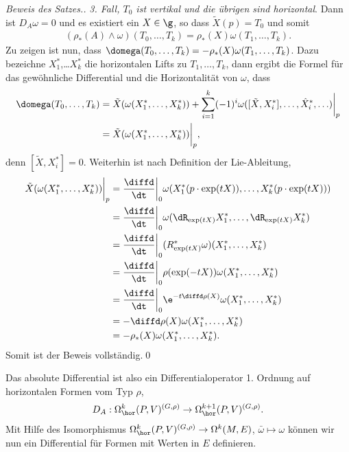 \documentclass[%
	paper=a5,%
	fleqn,%
	DIV=18,%
	BCOR=0mm,
	fontsize=11pt,
	titlepage=false,%
	bibliography=totoc,
	DIV=18,%
	twoside=true,
	pdftitle=Riemannsche Geometrie,
	pdfauthor=Uwe Semmelmann,
	numbers=noendperiod]%
	{scrbook}
\begin{document}
\begin{proof}[Beweis des Satzes.]
\textit{3. Fall, $T_0$ ist vertikal und die übrigen sind horizontal}. Dann ist
$D_A\omega = 0$ und es existiert ein $X\in \g$, so dass $\widetilde{X}(p) = T_0$
und somit
\begin{align*}
(\rho_*(A)\wedge\omega)(T_0,\ldots,T_k) = 
\rho_*(X)\omega(T_1,\ldots,T_k).
\end{align*}
Zu zeigen ist nun, dass $\domega(T_0,\ldots,T_k) =
-\rho_*(X)\omega(T_1,\ldots,T_k)$. Dazu bezeichne $X_1^*$,\ldots $X_k^*$ die
horizontalen Lifts zu $T_1,\ldots,T_k$, dann ergibt die Formel für das
gewöhnliche Differential und die Horizontalität von $\omega$, dass
\begin{align*}
\domega(T_0,\ldots,T_k) &= 
\tilde{X}(\omega(X_1^*,\ldots,X_k^*))
+ \sum_{i=1}^k
(-1)^{i} 
\omega([\tilde{X},X_i^*],\ldots,\hat{X}_i^*,\ldots)
\bigg|_{p}
\\
&= \tilde{X}(\omega(X_1^*,\ldots,X_k^*))\bigg|_{p},
\end{align*}
denn $[\tilde{X},X_i^*] = 0$. Weiterhin ist nach Definition der Lie-Ableitung,
\begin{align*}
\tilde{X}(\omega(X_1^*,\ldots,X_k^*))\bigg|_{p} &= 
\frac{\diffd}{\dt}\bigg|_0
\omega(X_1^*(p\cdot \exp(tX)),\ldots,X_k^*(p\cdot \exp(tX)))\\
&=
\frac{\diffd}{\dt}\bigg|_0
\omega(\dR_{\exp(tX)}X_1^*,\ldots,\dR_{\exp(tX)}X_k^*)\\
&= \frac{\diffd}{\dt}\bigg|_0
(R_{\exp(tX)}^*\omega)(X_1^*,\ldots,X_k^*)\\
&= \frac{\diffd}{\dt}\bigg|_0
\rho(\exp(-tX))\omega(X_1^*,\ldots,X_k^*)\\
&= \frac{\diffd}{\dt}\bigg|_0
\e^{-t\diffd\rho(X)}\omega(X_1^*,\ldots,X_k^*)\\
&= -\diffd\rho(X)\omega(X_1^*,\ldots,X_k^*)\\
&= -\rho_*(X)\omega(X_1^*,\ldots,X_k^*).
\end{align*}
Somit ist der Beweis vollständig.\qed
\end{proof}


Das absolute Differential ist also ein Differentialoperator 1. Ordnung auf
horizontalen Formen vom Typ $\rho$,
\begin{align*}
D_A : \Omega_\hor^k(P,V)^{(G,\rho)}\to \Omega_\hor^{k+1}(P,V)^{(G,\rho)}.
\end{align*}
Mit Hilfe des Isomorphismus $\Omega_\hor^k(P,V)^{(G,\rho)}\to \Omega^k(M,E)$,
$\bar{\omega}\mapsto \omega$ können wir nun ein Differential für Formen
mit Werten in $E$ definieren.
\end{document}
